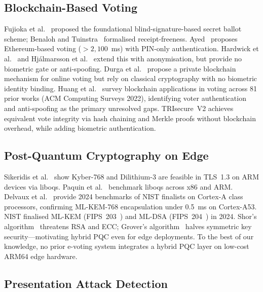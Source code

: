 \documentclass[submission]{sacjsub}
\begin{document}
\subsection{Blockchain-Based Voting}

Fujioka et al.~\cite{fujioka1992practical} proposed the foundational
blind-signature-based secret ballot scheme; Benaloh and
Tuinstra~\cite{benaloh1994receipt} formalised receipt-freeness.
Ayed~\cite{ayed2017conceptual} proposes Ethereum-based voting
(\(>2{,}100\)~ms) with PIN-only authentication. Hardwick et
al.~\cite{hardwick2018voting} and Hj\'{a}lmarsson et
al.~\cite{hjalmarsson2018blockchain} extend this with anonymisation,
but provide no biometric gate or anti-spoofing. Durga et
al.~\cite{durga2022blockchain} propose a private blockchain mechanism
for online voting but rely on classical cryptography with no biometric
identity binding. Huang et al.~\cite{huang2022blockchain_voting} survey
blockchain applications in voting across 81 prior works (ACM Computing
Surveys 2022), identifying voter authentication and anti-spoofing as
the primary unresolved gaps. TRIsecure~V2 achieves equivalent vote
integrity via hash chaining and Merkle proofs without blockchain
overhead, while adding biometric authentication.

\subsection{Post-Quantum Cryptography on Edge}

Sikeridis et al.~\cite{sikeridis2020pqc} show Kyber-768 and
Dilithium-3 are feasible in TLS~1.3 on ARM devices via liboqs. Paquin
et al.~\cite{paquin2020oqs} benchmark liboqs across x86 and ARM.
Delvaux et al.~\cite{delvaux2024pqc_iot} provide 2024 benchmarks of
NIST finalists on Cortex-A class processors, confirming ML-KEM-768
encapsulation under 0.5~ms on Cortex-A53. NIST finalised ML-KEM
(FIPS~203~\cite{nist_fips203}) and ML-DSA (FIPS~204~\cite{nist_fips204})
in 2024. Shor's algorithm~\cite{shor1994algorithms} threatens RSA and
ECC; Grover's algorithm~\cite{grover1996fast} halves symmetric key
security---motivating hybrid PQC even for edge deployments. To the
best of our knowledge, no prior e-voting system integrates a hybrid PQC
layer on low-cost ARM64 edge hardware.

\subsection{Presentation Attack Detection}
\end{document}
